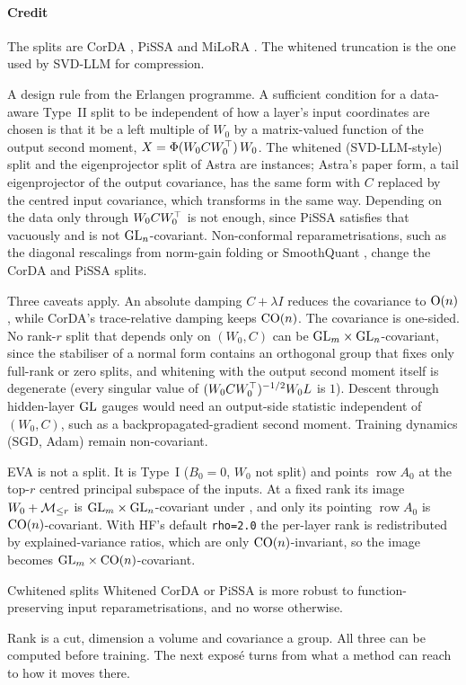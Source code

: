 \paragraph{Credit}
The splits are CorDA \citep{yang2024corda}, PiSSA \citep{meng2024pissa} and MiLoRA \citep{wang2024milora}. The whitened
truncation is the one used by SVD-LLM \citep{xwang2025svdllm} for compression.

\begin{explains}
A design rule from the Erlangen programme. A sufficient condition for a data-aware Type~II split to be independent of how
a layer's input coordinates are chosen is that it be a left multiple of $W_0$ by a matrix-valued function of the output
second moment, $X=\Phi(W_0CW_0^{\top})\,W_0$. The whitened (SVD-LLM-style) split and the eigenprojector split of Astra
\citep{liu2026astra} are instances; Astra's paper form, a tail eigenprojector of the output covariance, has the same form
with $C$ replaced by the centred input covariance, which transforms in the same way. Depending on the data only
through $W_0CW_0^{\top}$ is not enough, since PiSSA satisfies that vacuously and is not $\mathrm{GL}_n$-covariant. Non-conformal
reparametrisations, such as the diagonal rescalings from norm-gain folding or SmoothQuant \citep{xxiao2023smoothquant},
change the CorDA and PiSSA splits.
\end{explains}

Three caveats apply. An absolute damping $C+\lambda I$ reduces the covariance to $\mathrm{O}(n)$, while CorDA's trace-relative
damping keeps $\mathrm{CO}(n)$. The covariance is one-sided. No rank-$r$ split that depends only on $(W_0,C)$ can be
$\mathrm{GL}_m\times\mathrm{GL}_n$-covariant, since the stabiliser of a normal form contains an orthogonal group that fixes only
full-rank or zero splits, and whitening with the output second moment itself is degenerate (every singular value of
$(W_0CW_0^{\top})^{-1/2}W_0L$ is $1$). Descent through hidden-layer $\mathrm{GL}$ gauges would need an output-side statistic
independent of $(W_0,C)$, such as a backpropagated-gradient second moment. Training dynamics (SGD, Adam) remain
non-covariant.

EVA \citep{paischer2024parameter} is not a split. It is Type~I ($B_0=0$, $W_0$ not split) and points
$\operatorname{row}A_0$ at the top-$r$ centred principal subspace of the inputs. At a fixed rank its image $W_0+\mathcal{M}_{\le r}$ is
$\mathrm{GL}_m\times\mathrm{GL}_n$-covariant under , and only its pointing $\operatorname{row}A_0$ is
$\mathrm{CO}(n)$-covariant. With HF's default \texttt{rho=2.0} the per-layer rank is redistributed by explained-variance ratios,
which are only $\mathrm{CO}(n)$-invariant, so the image becomes $\mathrm{GL}_m\times\mathrm{CO}(n)$-covariant.

\begin{conjecture}{C}{whitened splits}
Whitened CorDA or PiSSA is more robust to function-preserving input reparametrisations, and no worse otherwise.
\end{conjecture}

Rank is a cut, dimension a volume and covariance a group. All three can be computed before training. The next exposé
turns from what a method can reach to how it moves there.
